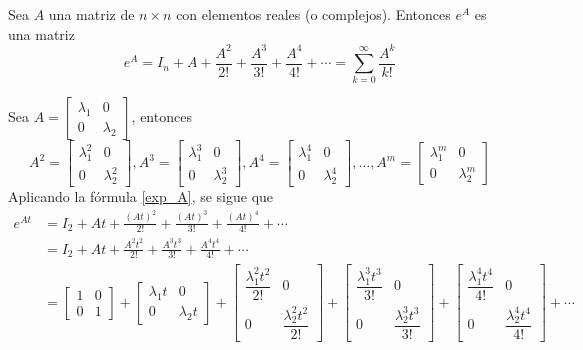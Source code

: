 \begin{definition}
    Sea $A$ una matriz de $n \times n$ con elementos reales (o complejos). Entonces $e^A$ es una matriz
    \begin{equation}
        e^A = I_n + A + \frac{A^2}{2!} + \frac{A^3}{3!} + \frac{A^4}{4!} + \cdots = \sum_{k=0}^{\infty} \frac{A^k}{k!} \label{exp_A}
    \end{equation}
\end{definition}

\begin{example}\label{exam:eAt}
    Sea $A = \begin{bmatrix} \lambda_1 & 0 \\ 0 & \lambda_2 \end{bmatrix}$, entonces
    $$A^2 = \begin{bmatrix} \lambda_1^2 & 0 \\ 0 & \lambda_2^2 \end{bmatrix}, A^3 = \begin{bmatrix} \lambda_1^3 & 0 \\ 0 & \lambda_2^3 \end{bmatrix}, A^4 = \begin{bmatrix} \lambda_1^4 & 0 \\ 0 & \lambda_2^4 \end{bmatrix}, \dots, A^m = \begin{bmatrix} \lambda_1^m & 0 \\ 0 & \lambda_2^m \end{bmatrix}$$
    Aplicando la fórmula \eqref{exp_A}, se sigue que
    \begin{align*}
        e^{At} & = I_2 + At + \frac{(At)^2}{2!} + \frac{(At)^3}{3!} + \frac{(At)^4}{4!} + \cdots \\
        & = I_2 + At + \frac{A^2t^2}{2!} + \frac{A^3t^3}{3!} + \frac{A^4t^4}{4!} + \cdots \\
        & = \begin{bmatrix} 1 & 0 \\ 0 & 1 \end{bmatrix} + \begin{bmatrix} \lambda_1 t & 0 \\ 0 & \lambda_2 t \end{bmatrix} + \begin{bmatrix} \dfrac{\lambda_1^2 t^2}{2!} & 0 \\[2mm] 0 & \dfrac{\lambda_2^2 t^2}{2!} \end{bmatrix} + \begin{bmatrix} \dfrac{\lambda_1^3 t^3}{3!} & 0 \\[2mm] 0 & \dfrac{\lambda_2^3 t^3}{3!} \end{bmatrix} + \begin{bmatrix} \dfrac{\lambda_1^4 t^4}{4!} & 0 \\[2mm] 0 & \dfrac{\lambda_2^4 t^4}{4!} \end{bmatrix} + \cdots \\

\end{align*}
\end{example}
